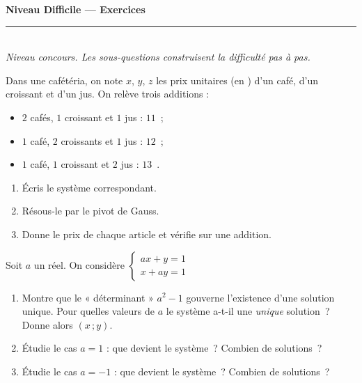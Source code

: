 \documentclass[11pt,a4paper]{article}
\newcommand{\euro}{\texteuro}
\newcommand{\ds}{\displaystyle}
\begin{document}
\begin{center}
{\LARGE\bfseries\color{primarydark} Niveau Difficile — Exercices}\\[2pt]
{\color{primary}\rule{0.45\textwidth}{1.2pt}}\\[3pt]
{\small\itshape Niveau concours. Les sous-questions construisent la difficulté pas à pas.}
\end{center}
\vspace{1mm}

\begin{exo}
Dans une cafétéria, on note $x$, $y$, $z$ les prix unitaires (en \euro) d'un café, d'un croissant et
d'un jus. On relève trois additions :
\begin{itemize}[leftmargin=1.6em,topsep=1pt,itemsep=0.5pt]
  \item $2$ cafés, $1$ croissant et $1$ jus : $11$~\euro ;
  \item $1$ café, $2$ croissants et $1$ jus : $12$~\euro ;
  \item $1$ café, $1$ croissant et $2$ jus : $13$~\euro.
\end{itemize}
\begin{enumerate}[label=\textbf{\alph*)},leftmargin=2.2em,topsep=1pt,itemsep=2pt]
  \item Écris le système correspondant.
  \item Résous-le par le pivot de Gauss.
  \item Donne le prix de chaque article et vérifie sur une addition.
\end{enumerate}
\end{exo}

\begin{exo}
Soit $a$ un réel. On considère $\ds\begin{cases} ax+y=1\\ x+ay=1\end{cases}$
\begin{enumerate}[label=\textbf{\alph*)},leftmargin=2.2em,topsep=1pt,itemsep=2pt]
  \item Montre que le « déterminant » $a^{2}-1$ gouverne l'existence d'une solution unique. Pour quelles valeurs de $a$ le système a-t-il une \emph{unique} solution~? Donne alors $(x\,;y)$.
  \item Étudie le cas $a=1$ : que devient le système~? Combien de solutions~?
  \item Étudie le cas $a=-1$ : que devient le système~? Combien de solutions~?
\end{enumerate}
\end{exo}
\end{document}
